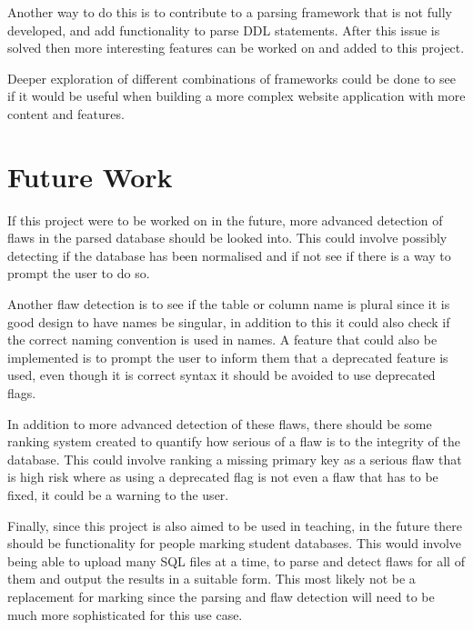 Another way to do this is to contribute to a parsing framework that is not fully developed, and add functionality to parse DDL statements. After this issue is solved then more interesting features can be worked on and added to this project.

Deeper exploration of different combinations of frameworks could be done to see if it would be useful when building a more complex website application with more content and features. 

\section{Future Work}

If this project were to be worked on in the future, more advanced detection of flaws in the parsed database should be looked into. This could involve possibly detecting if the database has been normalised and if not see if there is a way to prompt the user to do so. 

Another flaw detection is to see if the table or column name is plural since it is good design to have names be singular, in addition to this it could also check if the correct naming convention is used in names. A feature that could also be implemented is to prompt the user to inform them that a deprecated feature is used, even though it is correct syntax it should be avoided to use deprecated flags.

In addition to more advanced detection of these flaws, there should be some ranking system created to quantify how serious of a flaw is to the integrity of the database. This could involve ranking a missing primary key as a serious flaw that is high risk where as using a deprecated flag is not even a flaw that has to be fixed, it could be a warning to the user.

Finally, since this project is also aimed to be used in teaching, in the future there should be functionality for people marking student databases. This would involve being able to upload many SQL files at a time, to parse and detect flaws for all of them and output the results in a suitable form. This most likely not be a replacement for marking since the parsing and flaw detection will need to be much more sophisticated for this use case.